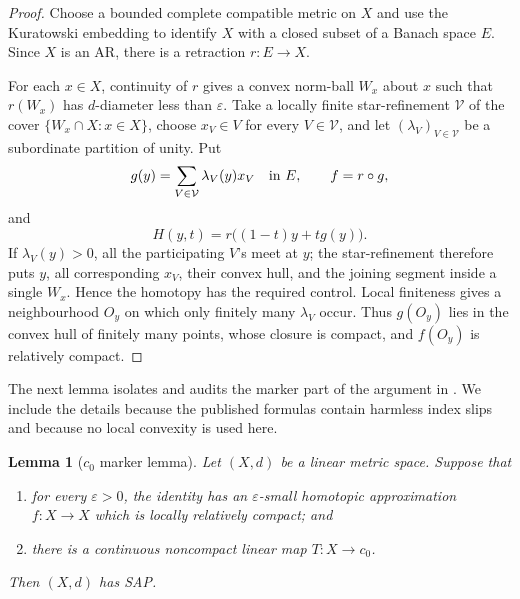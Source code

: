 \documentclass[11pt]{article}
\newtheorem{lemma}[theorem]{Lemma}
\begin{document}
\begin{proof}
Choose a bounded complete compatible metric on $X$ and use the Kuratowski
embedding to identify $X$ with a closed subset of a Banach space $E$.  Since
$X$ is an AR, there is a retraction $r:E\to X$.

For each $x\in X$, continuity of $r$ gives a convex norm-ball $W_x$ about
$x$ such that $r(W_x)$ has $d$-diameter less than $\varepsilon$.  Take a
locally finite star-refinement $\mathcal V$ of the cover
$\{W_x\cap X:x\in X\}$, choose $x_V\in V$ for every $V\in\mathcal V$, and
let $(\lambda_V)_{V\in\mathcal V}$ be a subordinate partition of unity.  Put
\[
 g(y)=\sum_{V\in\mathcal V}\lambda_V(y)x_V\quad\hbox{in }E,
 \qquad f=r\circ g,
\]
and
\[
 H(y,t)=r\big((1-t)y+t g(y)\big).
\]
If $\lambda_V(y)>0$, all the participating $V$'s meet at $y$; the
star-refinement therefore puts $y$, all corresponding $x_V$, their convex
hull, and the joining segment inside a single $W_x$.  Hence the homotopy has
the required control.  Local finiteness gives a neighbourhood $O_y$ on which
only finitely many $\lambda_V$ occur.  Thus $g(O_y)$ lies in the convex hull
of finitely many points, whose closure is compact, and $f(O_y)$ is relatively
compact.
\end{proof}

The next lemma isolates and audits the marker part of the argument in
\cite[proof of Lemma~2]{BanakhCauty}.  We include the details because the
published formulas contain harmless index slips and because no local
convexity is used here.

\begin{lemma}[$c_0$ marker lemma]\label{lem:marker}
Let $(X,d)$ be a linear metric space.  Suppose that

\begin{enumerate}
\item for every $\varepsilon>0$, the identity has an $\varepsilon$-small
homotopic approximation $f:X\to X$ which is locally relatively compact; and
\item there is a continuous noncompact linear map $T:X\to c_0$.
\end{enumerate}

Then $(X,d)$ has SAP.
\end{lemma}
\end{document}
